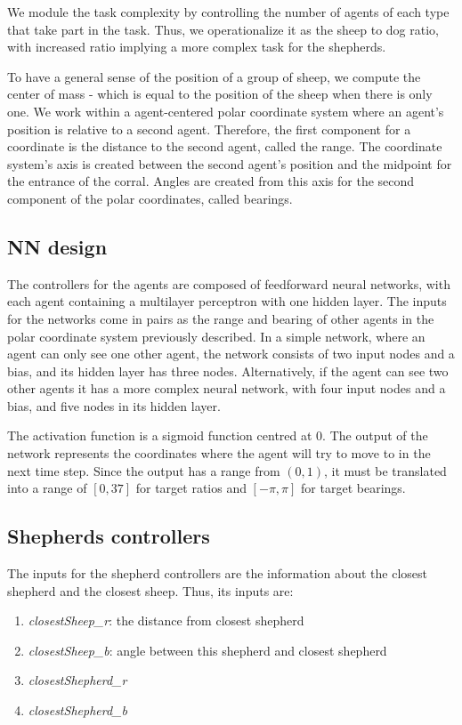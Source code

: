 \documentclass[conference]{IEEEtran}
\begin{document}
We module the task complexity by controlling the number of agents of each type that take part in the task. Thus, we operationalize it as the sheep to dog ratio, with increased ratio implying a more complex task for the shepherds.

To have a general sense of the position of a group of sheep, we compute the center of mass - which is equal to the position of the sheep when there is only one.
We work within a agent-centered polar coordinate system where an agent's position is relative to a second agent. Therefore, the first component for a coordinate is the distance to the second agent, called the range. The coordinate system's axis is created between the second agent's position and the midpoint for the entrance of the corral. Angles are created from this axis for the second component of the polar coordinates, called bearings. 


\subsection{NN design}
The controllers for the agents are composed of feedforward neural networks, with each agent containing a multilayer perceptron with one hidden layer. The inputs for the networks come in pairs as the range and bearing of other agents in the polar coordinate system previously described. In a simple network, where an agent can only see one other agent, the network consists of two input nodes and a bias, and its hidden layer has three nodes. Alternatively, if the agent can see two other agents it has a more complex neural network, with four input nodes and a bias, and five nodes in its hidden layer. 

The activation function is a sigmoid function centred at 0. The output of the network represents the coordinates where the agent will try to move to in the next time step. Since the output has a range from $(0, 1)$, it must be translated into a range of $[0, 37]$ for target ratios and $[-\pi, \pi]$ for target bearings. 
 
\subsection{Shepherds controllers}
The inputs for the shepherd controllers are the information about the closest shepherd and the closest sheep. Thus, its inputs are: 

\begin{enumerate}
	\item \textit{closestSheep\_r}: the distance from closest shepherd
	\item \textit{closestSheep\_b}: angle between this shepherd and closest shepherd 
	\item \textit{closestShepherd\_r}
	\item \textit{closestShepherd\_b}
\end{enumerate}
\end{document}
